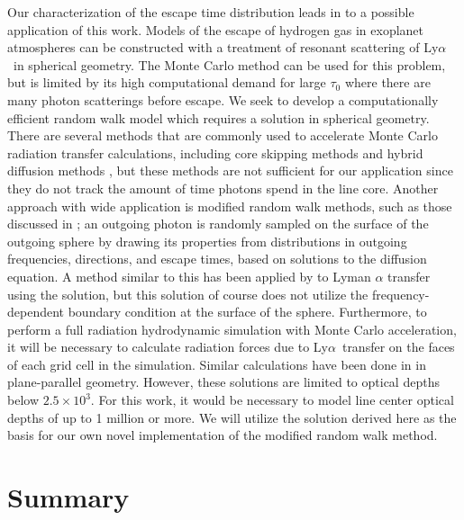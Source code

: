 \documentclass[linenumbers]{aastex63}
\newcommand\lya{Ly$\alpha$\ }
\begin{document}
Our characterization of the escape time distribution leads in to a possible application of this work. Models of the escape of hydrogen gas in exoplanet atmospheres can be constructed with a treatment of resonant scattering of \lya in spherical geometry. The Monte Carlo method can be used for this problem, but is limited by its high computational demand for large $\tau_0$ where there are many photon scatterings before escape. We seek to develop a computationally efficient random walk model which requires a solution in spherical geometry. There are several methods that are commonly used to accelerate Monte Carlo radiation transfer calculations, including core skipping methods \citep{1968ApJ...153..783A,2002ApJ...567..922A} and hybrid diffusion methods \citep{2018MNRAS.479.2065S}, but these methods are not sufficient for our application since they do not track the amount of time photons spend in the line core. Another approach with wide application is modified random walk methods, such as those discussed in \citet{1984JCoPh..54..508F, 2009A&A...497..155M, 2010A&A...520A..70R}; an outgoing photon is randomly sampled on the surface of the outgoing sphere by drawing its properties from distributions in outgoing frequencies, directions, and escape times, based on solutions to the diffusion equation. A method similar to this has been applied by \citet{2006ApJ...645..792T} to Lyman $\alpha$ transfer using the \citet{1990ApJ...350..216N} solution, but this solution of course does not utilize the frequency-dependent boundary condition at the surface of the sphere. Furthermore, to perform a full radiation hydrodynamic simulation with Monte Carlo acceleration, it will be necessary to calculate radiation forces due to \lya transfer on the faces of each grid cell in the simulation. Similar calculations have been done in \citet{1976ApJ...208..286W} in plane-parallel geometry. However, these solutions are limited to optical depths below $2.5 \times 10^3$. For this work, it would be necessary to model line center optical depths of up to 1 million or more. We will utilize the solution derived here as the basis for our own novel implementation of the modified random walk method.

\section{Summary}
\end{document}
